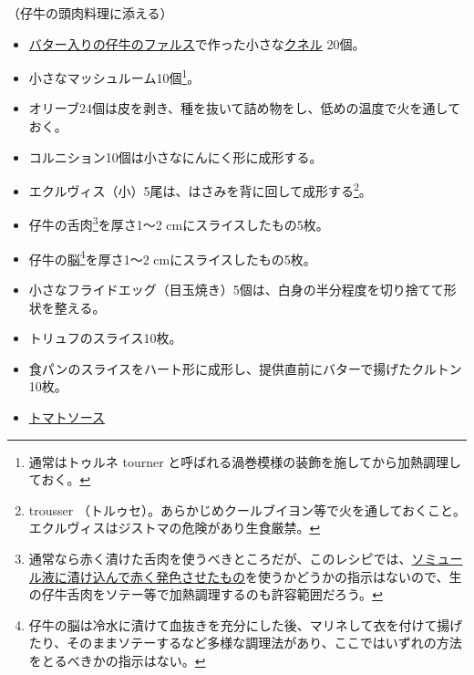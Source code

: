 \begin{recette}


（仔牛の頭肉料理に添える）

\begin{itemize}
\item
  \protect\hyperlink{farce-b}{バター入りの仔牛のファルス}で作った小さな\protect\hyperlink{quenelles-diverses}{クネル}
  20個。
\item
  小さなマッシュルーム10個\footnote{通常はトゥルネ tourner
    と呼ばれる渦巻模様の装飾を施してから加熱調理しておく。}。
\item
  オリーブ24個は皮を剥き、種を抜いて詰め物をし、低めの温度で火を通しておく。
\item
  コルニション10個は小さなにんにく形に成形する。
\item
  エクルヴィス（小）5尾は、はさみを背に回して成形する\footnote{trousser
    （トルゥセ）。あらかじめクールブイヨン等で火を通しておくこと。エクルヴィスはジストマの危険があり生食厳禁。}。
\item
  仔牛の舌肉\footnote{通常なら赤く漬けた舌肉を使うべきところだが、このレシピでは、\protect\hyperlink{saumure-liquide-pour-langues}{ソミュール液に漬け込んで赤く発色させたもの}を使うかどうかの指示はないので、生の仔牛舌肉をソテー等で加熱調理するのも許容範囲だろう。}を厚さ1〜2
  cmにスライスしたもの5枚。
\item
  仔牛の脳\footnote{仔牛の脳は冷水に漬けて血抜きを充分にした後、マリネして衣を付けて揚げたり、そのままソテーするなど多様な調理法があり、ここではいずれの方法をとるべきかの指示はない。}を厚さ1〜2
  cmにスライスしたもの5枚。
\item
  小さなフライドエッグ（目玉焼き）5個は、白身の半分程度を切り捨てて形状を整える。
\item
  トリュフのスライス10枚。
\item
  食パンのスライスをハート形に成形し、提供直前にバターで揚げたクルトン10枚。
\item
  \protect\hyperlink{sauce-tomate}{トマトソース}
\end{itemize}

\atoaki{}

\hypertarget{garniture-a-la-toulousaine}{%
}
\end{recette}
